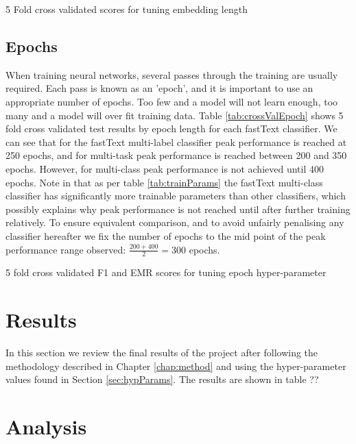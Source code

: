 \documentclass[Dissertation.tex]{subfiles}
\begin{document}
\begin{table}
	\caption{5 Fold cross validated scores for tuning embedding length }
	\label{tab:embedTuning}
	\centering
	
\end{table}

\subsection{Epochs}
When training neural networks, several passes through the training are usually required. Each pass is known as an 'epoch', and it is important to use an appropriate number of epochs. Too few and a model will not learn enough, too many and a model will over fit training data. Table \ref{tab:crossValEpoch} shows 5 fold cross validated test results by epoch length for each fastText classifier. We can see that for the fastText multi-label classifier peak performance is reached at 250 epochs, and for multi-task peak performance is reached between 200 and 350 epochs. However, for multi-class peak performance is not achieved until 400 epochs. Note in that as per table \ref{tab:trainParams} the fastText multi-class classifier has significantly more trainable parameters than other classifiers, which possibly explains why peak performance is not reached until after further training relatively. To ensure equivalent comparison, and to avoid unfairly penalising any classifier hereafter we fix the number of epochs to the mid point of the peak performance range observed: $ \frac{200+400}{2}=300 $ epochs.
\begin{table}
	\caption{5 fold cross validated F1 and EMR scores for tuning epoch hyper-parameter}
	\label{tab:crossValEpoch}
	\centering
	
\end{table}


\section{Results}
In this section we review the final results of the project after following the methodology described in Chapter \ref{chap:method} and using the hyper-parameter values found in Section \ref{sec:hypParams}. The results are shown in table ??



\section{Analysis}
\end{document}
